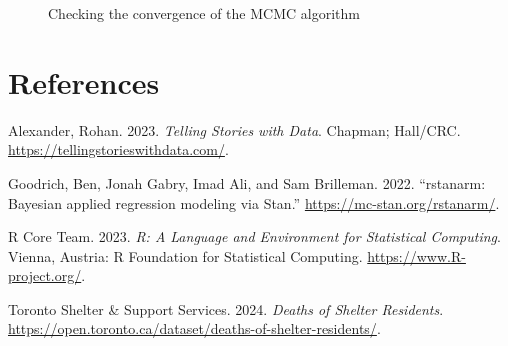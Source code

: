 \documentclass[
  letterpaper,
  DIV=11,
  numbers=noendperiod]{scrartcl}
\newlength{\cslhangindent}
\newlength{\cslentryspacingunit} %
\newenvironment{CSLReferences}[2] %
 {%
  \setlength{\parindent}{0pt}
  \ifodd #1
  \let\oldpar\par
  \def\par{\hangindent=\cslhangindent\oldpar}
  \fi
  \setlength{\parskip}{#2\cslentryspacingunit}
 }%
 {}
\begin{document}
\begin{figure}
\begin{minipage}[t]{0.50\linewidth}
{{}

}

\end{minipage}%

\caption{\label{fig-stanareyouokay}Checking the convergence of the MCMC
algorithm}

\end{figure}

\newpage

\hypertarget{references}{%
\section*{References}\label{references}}

\hypertarget{refs}{}
\begin{CSLReferences}{1}{0}
\leavevmode{}%
Alexander, Rohan. 2023. \emph{Telling Stories with Data}. Chapman;
Hall/CRC. \url{https://tellingstorieswithdata.com/}.

\leavevmode{}%
Goodrich, Ben, Jonah Gabry, Imad Ali, and Sam Brilleman. 2022.
{``{rstanarm: {Bayesian} applied regression modeling via {Stan}}.''}
\url{https://mc-stan.org/rstanarm/}.

\leavevmode{}%
R Core Team. 2023. \emph{{R: A Language and Environment for Statistical
Computing}}. Vienna, Austria: R Foundation for Statistical Computing.
\url{https://www.R-project.org/}.

\leavevmode{}%
Toronto Shelter \& Support Services. 2024. \emph{Deaths of Shelter
Residents}.
\url{https://open.toronto.ca/dataset/deaths-of-shelter-residents/}.

\end{CSLReferences}
\end{document}
